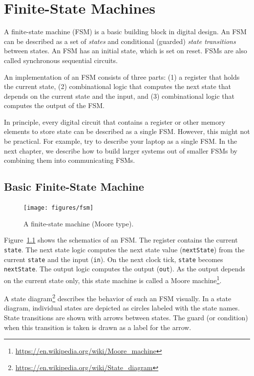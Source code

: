 \documentclass[%
    10pt,
    headinclude, footexclude,
    openright, %
    notitlepage,
    cleardoubleempty,
    headsepline,
    pointlessnumbers,
    bibtotoc, idxtotoc,
    ]{scrbook}
\newcommand{\code}[1]{{\lstinline[basicstyle=\small\ttfamily]{#1}}}
\newcommand{\myref}[2]{\href{#1}{#2}}
\renewcommand{\myref}[2]{{#2}{\footnote{\url{#1}}}}
\begin{document}
\chapter{Finite-State Machines}

A finite-state machine (FSM) is a basic building block in digital design.
An FSM can be described as a set of \emph{states} and conditional (guarded)
\emph{state transitions} between states.
An FSM has an initial state, which is set on reset.
FSMs are also called synchronous sequential circuits.

An implementation of an FSM consists of three parts: (1) a register that holds the current state,
(2) combinational logic that computes the next state that depends on the current
state and the input, and (3) combinational logic that computes the output of the FSM.

In principle, every digital circuit that contains a register or other memory elements
to store state can be described as a single FSM. However, this might
not be practical. For example, try to describe your laptop as a single FSM.
In the next chapter, we describe how to build larger systems
out of smaller FSMs by combining them into communicating FSMs.

\section{Basic Finite-State Machine}

\begin{figure}
  \centering
  \texttt{[image: figures/fsm]} %
  \caption{A finite-state machine (Moore type).}
  \label{fig:fsm}
\end{figure}

Figure~\ref{fig:fsm} shows the schematics of an FSM. The register contains the current \code{state}.
The next state logic computes the next state value (\code{nextState})
from the current \code{state} and the input (\code{in}).
On the next clock tick, \code{state} becomes \code{nextState}.
The output logic computes the output (\code{out}). As the output depends on the current
state only, this state machine is called a
\myref{https://en.wikipedia.org/wiki/Moore_machine}{Moore machine}.


A \myref{https://en.wikipedia.org/wiki/State_diagram}{state diagram}
describes the behavior of such an FSM visually.
In a state diagram, individual states are depicted as circles labeled
with the state names.
State transitions are shown with arrows between states.
The guard (or condition) when this transition is taken is drawn as a label
for the arrow.
\end{document}
